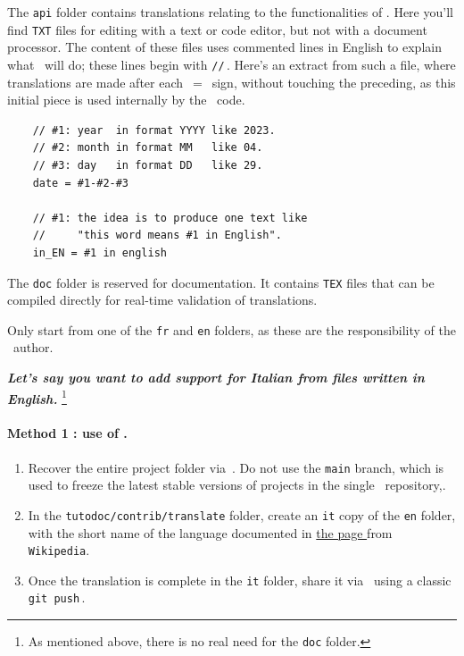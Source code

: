 \begin{tdocimp}
    The \verb#api# folder contains translations relating to the functionalities of \thisproj.
    Here you'll find \verb#TXT# files for editing with a text or code editor, but not with a document processor.
    The content of these files uses commented lines in English to explain what \thisproj\ will do; these lines begin with \verb#//#\,. Here's an extract from such a file, where translations are made after each \,$=$\ sign, without touching the preceding, as this initial piece is used internally by the \thisproj\ code.

    \tdocsep
    \vspace{-10pt}
    \begin{verbatim}
    // #1: year  in format YYYY like 2023.
    // #2: month in format MM   like 04.
    // #3: day   in format DD   like 29.
    date = #1-#2-#3

    // #1: the idea is to produce one text like
    //     "this word means #1 in English".
    in_EN = #1 in english\end{verbatim}
\end{tdocimp}


\begin{tdocnote}
    The \verb#doc# folder is reserved for documentation. It contains \verb#TEX# files that can be compiled directly for real-time validation of translations.
\end{tdocnote}


\begin{tdocwarn}
    Only start from one of the \verb#fr# and \verb#en# folders, as these are the responsibility of the \thisproj\ author.
\end{tdocwarn}


\medskip


\emph{\textbf{Let's say you want to add support for Italian from files written in English.}}%
\footnote{
    As mentioned above, there is no real need for the \texttt{doc} folder.
}


\paragraph{Method 1 : use of \git.}

\begin{enumerate}
      \item Recover the entire project folder via \thisrepo\,.
    Do not use the \verb#main# branch, which is used to freeze the latest stable versions of projects in the single \thismonorepo\ repository,.

      \item In the \verb#tutodoc/contrib/translate# folder, create an \verb#it# copy of the \verb#en# folder, with the short name of the language documented in
      \href{https://en.wikipedia.org/wiki/IETF_language_tag#List_of_common_primary_language_subtags}%
           {the page }
      from \texttt{Wikipedia}.

      \item Once the translation is complete in the \verb#it# folder, share it via \thisrepo\ using a classic \verb#git push#\,.
\end{enumerate}


